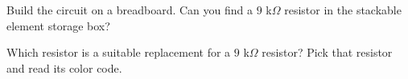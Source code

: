 \documentclass[11pt]{article}
\begin{document}
\begin{question}
    \begin{subquestion}{Build the circuit on a breadboard. Can you find a $9$ k$\Omega$ resistor in the stackable element storage box? }
    \end{subquestion}

    \begin{subquestion}{Which resistor is a suitable replacement for a $9$ k$\Omega$ resistor? Pick that resistor and read its color code.}
    \end{subquestion}


\end{question}
\end{document}
